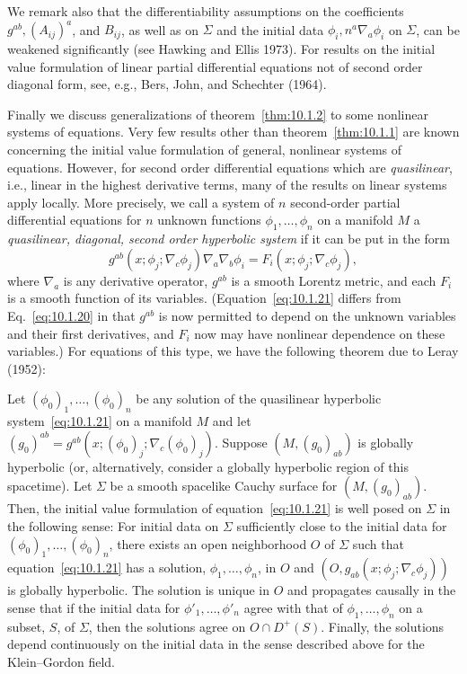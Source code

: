 We remark also that the differentiability assumptions on the coefficients
\(g^{ab},(A_{ij})^a\), and \(B_{ij}\), as well as on \(\Sigma\) and the initial data
\(\phi_i,n^a\nabla_a\phi_i\) on \(\Sigma\), can be weakened significantly (see
Hawking and Ellis 1973). For results on the initial value formulation of linear partial
differential equations not of second order diagonal form, see, e.g., Bers, John, and
Schechter (1964).

Finally we discuss generalizations of theorem~\ref{thm:10.1.2} to some nonlinear
systems of equations. Very few results other than theorem~\ref{thm:10.1.1} are known
concerning the initial value formulation of general, nonlinear systems of equations.
However, for second order differential equations which are \emph{quasilinear}, i.e.,
linear in the highest derivative terms, many of the results on linear systems apply
locally. More precisely, we call a system of \(n\) second-order partial differential
equations for \(n\) unknown functions \(\phi_1,\ldots,\phi_n\) on a manifold \(M\)
a \emph{quasilinear, diagonal, second order hyperbolic system} if it can be put in the
form
\begin{equation}
  g^{ab}(x;\phi_j;\nabla_c\phi_j)\nabla_a\nabla_b\phi_i
  =F_i(x;\phi_j;\nabla_c\phi_j),
  \tag{10.1.21}\label{eq:10.1.21}
\end{equation}
where \(\nabla_a\) is any derivative operator, \(g^{ab}\) is a smooth Lorentz metric,
and each \(F_i\) is a smooth function of its variables. (Equation~\eqref{eq:10.1.21}
differs from Eq.~\eqref{eq:10.1.20} in that \(g^{ab}\) is now permitted to depend on
the unknown variables and their first derivatives, and \(F_i\) now may have nonlinear
dependence on these variables.) For equations of this type, we have the following
theorem due to Leray (1952):

\begin{theorem}\label{thm:10.1.3}
Let \((\phi_0)_1,\ldots,(\phi_0)_n\) be any solution of the quasilinear hyperbolic
system~\eqref{eq:10.1.21} on a manifold \(M\) and let
\((g_0)^{ab}=g^{ab}(x;(\phi_0)_j;\nabla_c(\phi_0)_j)\). Suppose
\((M,(g_0)_{ab})\) is globally hyperbolic (or, alternatively, consider a globally
hyperbolic region of this spacetime). Let \(\Sigma\) be a smooth spacelike Cauchy
surface for \((M,(g_0)_{ab})\). Then, the initial value formulation of
equation~\eqref{eq:10.1.21} is well posed on \(\Sigma\) in the following sense: For
initial data on \(\Sigma\) sufficiently close to the initial data for
\((\phi_0)_1,\ldots,(\phi_0)_n\), there exists an open neighborhood \(O\) of
\(\Sigma\) such that equation~\eqref{eq:10.1.21} has a solution,
\(\phi_1,\ldots,\phi_n\), in \(O\) and
\((O,g_{ab}(x;\phi_j;\nabla_c\phi_j))\) is globally hyperbolic. The solution is
unique in \(O\) and propagates causally in the sense that if the initial data for
\(\phi'_1,\ldots,\phi'_n\) agree with that of \(\phi_1,\ldots,\phi_n\) on a subset,
\(S\), of \(\Sigma\), then the solutions agree on \(O\cap D^+(S)\). Finally, the
solutions depend continuously on the initial data in the sense described above for
the Klein--Gordon field.
\end{theorem}

